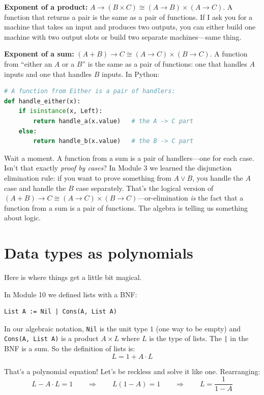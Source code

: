 \documentclass[11pt]{article}
\begin{document}
\medskip
\noindent\textbf{Exponent of a product:} $A \to (B \times C) \cong (A \to B) \times (A \to C)$. A function that returns a pair is the same as a pair of functions. If I ask you for a machine that takes an input and produces two outputs, you can either build one machine with two output slots or build two separate machines---same thing.

\medskip
\noindent\textbf{Exponent of a sum:} $(A + B) \to C \cong (A \to C) \times (B \to C)$. A function from ``either an $A$ or a $B$'' is the same as a pair of functions: one that handles $A$ inputs and one that handles $B$ inputs. In Python:

\begin{lstlisting}[language=Python]
# A function from Either is a pair of handlers:
def handle_either(x):
    if isinstance(x, Left):
        return handle_a(x.value)   # the A -> C part
    else:
        return handle_b(x.value)   # the B -> C part
\end{lstlisting}

Wait a moment. A function from a sum is a pair of handlers---one for each case. Isn't that exactly \emph{proof by cases}? In Module 3 we learned the disjunction elimination rule: if you want to prove something from $A \vee B$, you handle the $A$ case and handle the $B$ case separately. That's the logical version of $(A + B) \to C \cong (A \to C) \times (B \to C)$---or-elimination \emph{is} the fact that a function from a sum is a pair of functions. The algebra is telling us something about logic.

\section{Data types as polynomials}

Here is where things get a little bit magical.

In Module 10 we defined lists with a BNF:

\begin{lstlisting}
List A := Nil | Cons(A, List A)
\end{lstlisting}

In our algebraic notation, \texttt{Nil} is the unit type $1$ (one way to be empty) and \texttt{Cons(A, List A)} is a product $A \times L$ where $L$ is the type of lists. The \texttt{|} in the BNF is a sum. So the definition of lists is:
\[
L = 1 + A \cdot L
\]

That's a polynomial equation! Let's be reckless and solve it like one. Rearranging:
\[
L - A \cdot L = 1 \qquad \Longrightarrow \qquad L(1 - A) = 1 \qquad \Longrightarrow \qquad L = \frac{1}{1 - A}
\]
\end{document}
